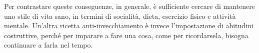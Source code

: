Per contrastare queste conseguenze, in generale, è sufficiente cercare di
mantenere uno stile di vita sano, in termini di socialità, dieta, esercizio
fisico e attività mentale. Un’altra ricetta anti-invecchiamento è invece
l’impostazione di abitudini costruttive, perché per imparare a fare una cosa,
come per ricordarsela, bisogna continuare a farla nel tempo. \cite{SOM}